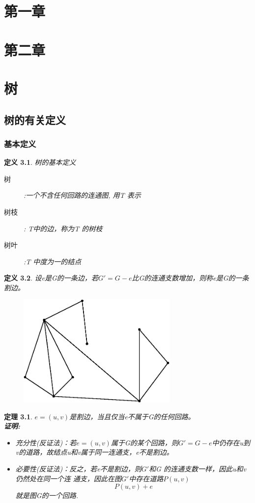 \documentclass[11pt,a4paper,openany]{book}
\newtheorem{theorem}{\textbf{定理}}[section]
\newtheorem{defination}{\textbf{定义}}[section]
\begin{document}
\pagestyle{plain}  %
\chapter{第一章}

\chapter{第二章}
\chapter{树}
\section{树的有关定义}
\subsection{基本定义}
\begin{defination}
树的基本定义\begin{description}
        \item[树] :一个不含任何回路的连通图, 用T 表示
        \item[树枝]: T中的边，称为T 的树枝
        \item[树叶] :T 中度为一的结点
      \end{description}
\end{defination}
\begin{defination}
设e是G的一条边，若$G'=G-e$比G的连通支数增加，则称e是G的一条割边。\\
\begin{figure}[H]
  \centering
  \includegraphics[width=0.7\textwidth]{3_1.eps}\\
  \caption{}
\end{figure}
\end{defination}
\begin{theorem}
$e=(u,v)$是割边，当且仅当e不属于G的任何回路。\\
\textbf{证明:}\\
\begin{itemize}
  \item 充分性(反证法)：若$e=(u,v)$属于G的某个回路，则$G'=G-e$中仍存在u到v的道路，故结点u和v属于同一连通支，e不是割边。
  \item 必要性(反证法)：反之，若e不是割边，则$G'$和G
的连通支数一样，因此u和v仍然处在同一个连
通支，因此在图$G'$中存在道路$P(u,v)$ $$P(u,v)+e$$就是图G的一个回路.
\end{itemize}
\end{theorem}
\end{document}
